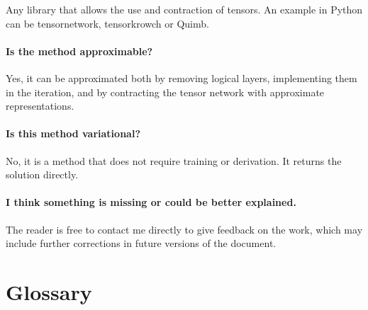 Any library that allows the use and contraction of tensors. An example in Python can be tensornetwork, tensorkrowch or Quimb.

\paragraph{Is the method approximable?}

Yes, it can be approximated both by removing logical layers, implementing them in the iteration, and by contracting the tensor network with approximate representations.

\paragraph{Is this method variational?}

No, it is a method that does not require training or derivation. It returns the solution directly.

\paragraph{I think something is missing or could be better explained.}

The reader is free to contact me directly to give feedback on the work, which may include further corrections in future versions of the document.







\newpage

\section{Glossary}

